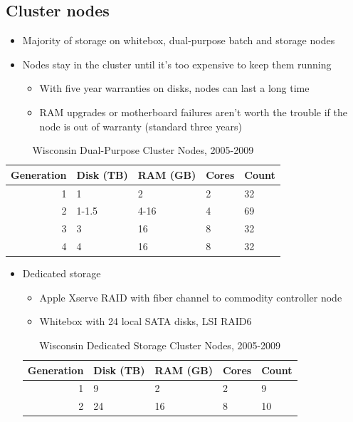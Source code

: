\documentclass{beamer}
\begin{document}
\subsection{Cluster nodes}
\begin{frame}
\begin{itemize}
	\item Majority of storage on whitebox, dual-purpose batch and storage nodes
	\item Nodes stay in the cluster until it's too expensive to keep them running
	\begin{itemize}
		\item With five year warranties on disks, nodes can last a long time
		\item RAM upgrades or motherboard failures aren't worth the trouble if the node is out of warranty (standard three years)
	\end{itemize}
	\end{itemize}

	\begin{table}
	\begin{tabular}{rllll}
		\toprule
		Generation	& Disk (TB)	& RAM (GB)	& Cores	& Count	\\
		\midrule
		1		& 1		& 2		& 2	& 32	\\ %
		2		& 1-1.5		& 4-16		& 4	& 69	\\ %
		3		& 3		& 16		& 8	& 32	\\ %
		4		& 4		& 16		& 8	& 32	\\ %
		\bottomrule
	\end{tabular}
	\caption{Wisconsin Dual-Purpose Cluster Nodes, 2005-2009}
	\label{cluster_nodes}
	\end{table}
\end{frame}

\begin{frame}
\begin{itemize}
	\item Dedicated storage
	\begin{itemize}
		\item Apple Xserve RAID with fiber channel to commodity controller node
		\item Whitebox with 24 local SATA disks, LSI RAID6
	\end{itemize}
	\begin{table}
	\begin{tabular}{rllll}
		\toprule
		Generation	& Disk (TB)	& RAM (GB)	& Cores	& Count	\\
		\midrule
		1		& 9		& 2		& 2	& 9	\\ %
		2		& 24		& 16		& 8	& 10	\\ %
		\bottomrule
	\end{tabular}
	\caption{Wisconsin Dedicated Storage Cluster Nodes, 2005-2009}
	\label{cluster_nodes}
	\end{table}
\end{itemize}
\end{frame}
\end{document}
